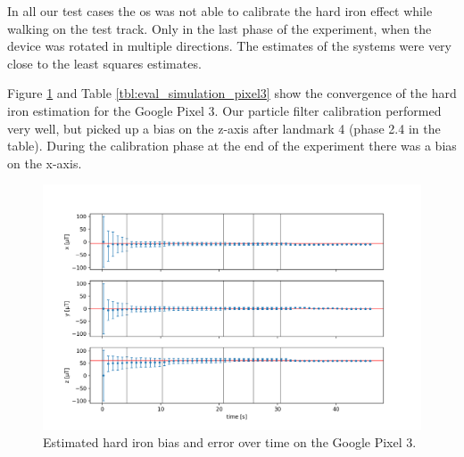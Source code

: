 In all our test cases the \gls{os} was not able to calibrate the hard iron effect while walking on the test track. Only in the last phase of the experiment, when the device was rotated in multiple directions. The estimates of the systems were very close to the least squares estimates.

Figure \ref{fig:eval_simulation_pixel3} and Table \ref{tbl:eval_simulation_pixel3} show the convergence of the hard iron estimation for the Google Pixel 3. Our particle filter calibration performed very well, but picked up a bias on the z-axis after landmark 4 (phase 2.4 in the table). During the calibration phase at the end of the experiment there was a bias on the x-axis.

\begin{figure}[H]
    \centering
    \includegraphics[width=1.0\textwidth]{figures/convergence_pixel3.png}
    \caption{Estimated hard iron bias and error over time on the Google Pixel 3.}
    \label{fig:eval_simulation_pixel3}
\end{figure}

